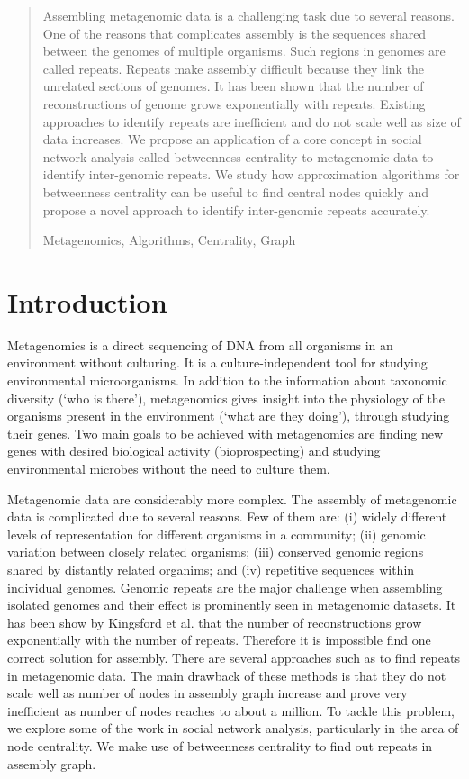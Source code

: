 \documentclass[runningheads,a4paper]{llncs}
\newcommand{\keywords}[1]{\par\addvspace\baselineskip
\noindent\keywordname\enspace\ignorespaces#1}
\begin{document}
\begin{abstract}
Assembling metagenomic data is a challenging task due to several reasons. One of the reasons that complicates assembly is the sequences shared between the genomes of multiple organisms. Such regions in genomes are called repeats. Repeats make assembly difficult because they link the unrelated sections of genomes. It has been shown that the number of reconstructions of genome grows exponentially with repeats. Existing approaches to identify repeats are inefficient and do not scale well as size of data increases. We propose an application of a core concept in social network analysis called betweenness centrality to metagenomic data to identify inter-genomic repeats. We study how approximation algorithms for betweenness centrality can be useful to find central nodes quickly and propose a novel approach to identify inter-genomic repeats accurately. 
\keywords{Metagenomics, Algorithms, Centrality, Graph}
\end{abstract}


\section{Introduction}

Metagenomics is a direct sequencing of DNA from all organisms in an environment without culturing.  It is a culture-independent tool for studying environmental microorganisms. In addition to the information about taxonomic diversity (‘who is there’), metagenomics gives insight into the physiology of the organisms present in the environment (‘what are they doing’), through studying their genes. Two main goals to be achieved with metagenomics are finding new genes with desired biological activity (bioprospecting) and studying environmental microbes without the need to culture them.

Metagenomic data are considerably more complex. The assembly of metagenomic data is complicated due to several reasons. Few of them are: (i) widely different levels of representation for different organisms in a community; (ii) genomic variation between closely related organisms; (iii) conserved genomic regions shared by distantly related organims; and (iv) repetitive sequences within individual genomes. Genomic repeats are the major challenge when assembling isolated genomes and their effect is prominently seen in metagenomic datasets. It has been show by Kingsford et al.\cite{kingsford} that the number of reconstructions grow exponentially with the number of repeats. Therefore it is impossible find one correct solution for assembly. There are several approaches such as \cite{bambus} to find repeats in metagenomic data. The main drawback of these methods is that they do not scale well as number of nodes in assembly graph increase and prove very inefficient as number of nodes reaches to about a million. To tackle this problem, we explore some of the work in social network analysis, particularly in the area of node centrality. We make use of betweenness centrality to find out repeats in assembly graph. 
\end{document}
